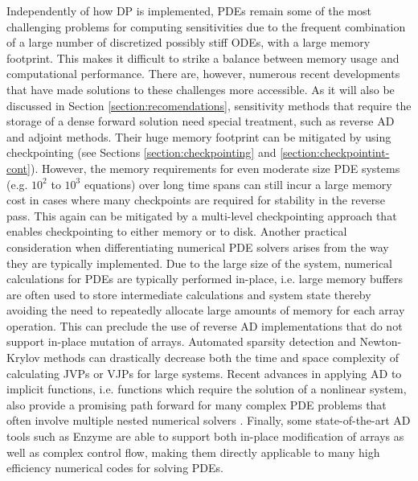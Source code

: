 Independently of how DP is implemented, PDEs remain some of the most challenging problems for computing sensitivities due to the frequent combination of a large number of discretized possibly stiff ODEs, with a large memory footprint. 
This makes it difficult to strike a balance between memory usage and computational performance. 
There are, however, numerous recent developments that have made solutions to these challenges more accessible. 
As it will also be discussed in Section \ref{section:recomendations}, sensitivity methods that require the storage of a dense forward solution need special treatment, such as reverse AD and adjoint methods. 
Their huge memory footprint can be mitigated by using checkpointing (see Sections \ref{section:checkpointing} and \ref{section:checkpointint-cont}).
However, the memory requirements for even moderate size PDE systems (e.g. $10^2$ to $10^3$ equations) over long time spans can still incur a large memory cost in cases where many checkpoints are required for stability in the reverse pass. 
This again can be mitigated by a multi-level checkpointing approach that enables checkpointing to either memory or to disk.
Another practical consideration when differentiating numerical PDE solvers arises from the way they are typically implemented. 
Due to the large size of the system, numerical calculations for PDEs are typically performed in-place, i.e. large memory buffers are often used to store intermediate calculations and system state thereby avoiding the need to repeatedly allocate large amounts of memory for each array operation. 
This can preclude the use of reverse AD implementations that do not support in-place mutation of arrays.
Automated sparsity detection \cite{gowdaSparsityProgrammingAutomated2019} and Newton-Krylov methods \cite{knollJacobianfreeNewtonKrylov2004,montoisonKrylovJlJulia2023} can drastically decrease both the time and space complexity of calculating JVPs or VJPs for large systems. 
Recent advances in applying AD to implicit functions, i.e. functions which require the solution of a nonlinear system, also provide a promising path forward for many complex PDE problems that often involve multiple nested numerical solvers \cite{blondelEfficientModularImplicit2022a}. 
Finally, some state-of-the-art AD tools such as Enzyme \cite{moses_Enzyme} are able to support both in-place modification of arrays as well as complex control flow, making them directly applicable to many high efficiency numerical codes for solving PDEs.




